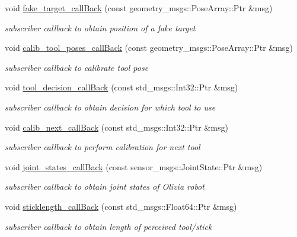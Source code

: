 \begin{DoxyCompactItemize}
void \hyperlink{structManipulate_a696de40873f30c2702d53bf9e342c1da}{fake\+\_\+target\+\_\+call\+Back} (const geometry\+\_\+msgs\+::\+Pose\+Array\+::\+Ptr \&msg)
\begin{DoxyCompactList}\small\item\em subscriber callback to obtain position of a fake target \end{DoxyCompactList}\item 
void \hyperlink{structManipulate_ab242dd492f9b8fc88564bb6583e0324a}{calib\+\_\+tool\+\_\+poses\+\_\+call\+Back} (const geometry\+\_\+msgs\+::\+Pose\+Array\+::\+Ptr \&msg)
\begin{DoxyCompactList}\small\item\em subscriber callback to calibrate tool pose \end{DoxyCompactList}\item 
void \hyperlink{structManipulate_a749da7d9cfed1b07a3aeb9f42e2258e8}{tool\+\_\+decision\+\_\+call\+Back} (const std\+\_\+msgs\+::\+Int32\+::\+Ptr \&msg)
\begin{DoxyCompactList}\small\item\em subscriber callback to obtain decision for which tool to use \end{DoxyCompactList}\item 
void \hyperlink{structManipulate_a9e3d1cc97074dbddcfe4abaa9a55425e}{calib\+\_\+next\+\_\+call\+Back} (const std\+\_\+msgs\+::\+Int32\+::\+Ptr \&msg)
\begin{DoxyCompactList}\small\item\em subscriber callback to perform calibration for next tool \end{DoxyCompactList}\item 
void \hyperlink{structManipulate_a197a10328ff64f9452a3b0be22dd8d70}{joint\+\_\+states\+\_\+call\+Back} (const sensor\+\_\+msgs\+::\+Joint\+State\+::\+Ptr \&msg)
\begin{DoxyCompactList}\small\item\em subscriber callback to obtain joint states of Olivia robot \end{DoxyCompactList}\item 
void \hyperlink{structManipulate_a4613e373fc630c6f172f8c62b0bbf6a2}{sticklength\+\_\+call\+Back} (const std\+\_\+msgs\+::\+Float64\+::\+Ptr \&msg)
\begin{DoxyCompactList}\small\item\em subscriber callback to obtain length of perceived tool/stick \end{DoxyCompactList}\item 

\end{DoxyCompactItemize}
